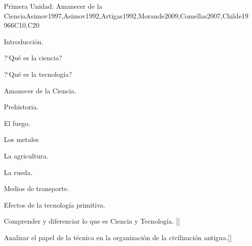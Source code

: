 \begin{syllabus}
\begin{unit}{}{Primera Unidad: Amanecer de la Ciencia}{Asimov1997,Asimov1992,Artigas1992,Morande2009,Comellas2007,Childe1996}{6}{C10,C20}
\begin{topics}
  \item Introducción.
    \begin{subtopics}
      \item ?`Qué es la ciencia?
      \item ?`Qué es la tecnología?
    \end{subtopics}
  \item Amanecer de la Ciencia.
    \begin{subtopics}
      \item Prehistoria.
      \item El fuego.
      \item Los metales
      \item La agricultura.
      \item La rueda.
      \item Medios de transporte.
      \item Efectos de la tecnología primitiva.
    \end{subtopics}
\end{topics}
\begin{learningoutcomes}
	\item Comprender y diferenciar lo que es Ciencia y Tecnología. [\Familiarity]
	\item Analizar el papel de la técnica en la organización de la civilización antigua.[\Familiarity]
\end{learningoutcomes}
\end{unit}


\end{syllabus}
